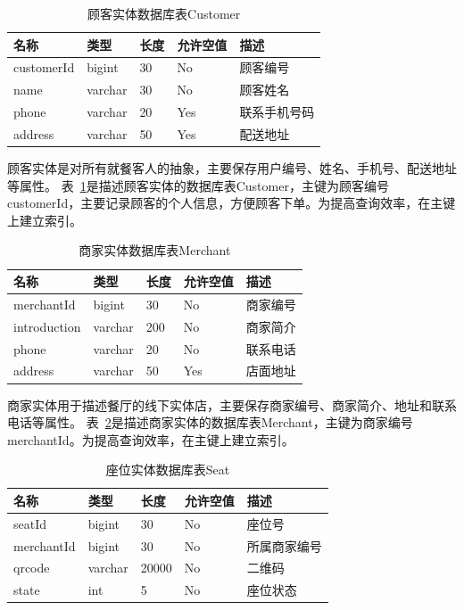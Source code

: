 \begin{table}[htbp!]\footnotesize
  \centering
  \caption{顾客实体数据库表Customer}
  \vspace{2mm}
  \begin{tabular}{lllll}
  \toprule
  \textbf{名称}&\textbf{类型}&\textbf{长度}&\textbf{允许空值}&\textbf{描述}\\
  \midrule 
  customerId& bigint& 30& No& 顾客编号\\
  \hline
  name& varchar& 30& No& 顾客姓名\\
  \hline
  phone& varchar& 20& Yes& 联系手机号码\\
  \hline
  address& varchar& 50& Yes& 配送地址\\
  \bottomrule
  \end{tabular}
  \label{table:ER1}
\end{table}

顾客实体是对所有就餐客人的抽象，主要保存用户编号、姓名、手机号、配送地址等属性。
表~\ref{table:ER1}是描述顾客实体的数据库表Customer，主键为顾客编号customerId，主要记录顾客的个人信息，方便顾客下单。为提高查询效率，在主键上建立索引。

\begin{table}[htbp!]\footnotesize
  \centering
  \caption{商家实体数据库表Merchant}
  \vspace{2mm}
  \begin{tabular}{lllll}
  \toprule
  \textbf{名称}&\textbf{类型}&\textbf{长度}&\textbf{允许空值}&\textbf{描述}\\
  \midrule 
  merchantId& bigint& 30& No& 商家编号\\
  \hline
  introduction& varchar& 200& No& 商家简介\\
  \hline
  phone& varchar& 20& No& 联系电话\\
  \hline
  address& varchar& 50& Yes& 店面地址\\
  \bottomrule
  \end{tabular}
  \label{table:ER2}
\end{table}

商家实体用于描述餐厅的线下实体店，主要保存商家编号、商家简介、地址和联系电话等属性。
表~\ref{table:ER2}是描述商家实体的数据库表Merchant，主键为商家编号merchantId。为提高查询效率，在主键上建立索引。

\begin{table}[htbp!]\footnotesize
  \centering
  \caption{座位实体数据库表Seat}
  \vspace{2mm}
  \begin{tabular}{lllll}
  \toprule
  \textbf{名称}&\textbf{类型}&\textbf{长度}&\textbf{允许空值}&\textbf{描述}\\
  \midrule 
  seatId& bigint& 30& No& 座位号\\
  \hline
  merchantId& bigint& 30& No& 所属商家编号\\
  \hline
  qrcode& varchar& 20000& No& 二维码\\
  \hline
  state& int& 5& No& 座位状态\\
  \bottomrule
  \end{tabular}
  \label{table:ER3}
\end{table}

